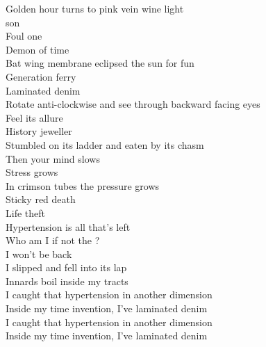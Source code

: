 Golden hour turns to pink vein wine light \\
 son \\
Foul one \\
Demon of time \\
Bat wing membrane eclipsed the sun for fun \\

Generation ferry \\
Laminated denim \\
Rotate anti-clockwise and see through backward facing eyes \\
Feel its allure \\
History jeweller \\
Stumbled on its ladder and eaten by its chasm \\
Then your mind slows \\
Stress grows \\
In crimson tubes the pressure grows \\
Sticky red death \\
Life theft \\
Hypertension is all that's left \\

Who am I if not the ? \\
I won't be back \\
I slipped and fell into its lap \\
Innards boil inside my tracts \\

I caught that hypertension in another dimension \\
Inside my time invention, I've laminated denim \\

I caught that hypertension in another dimension \\
Inside my time invention, I've laminated denim \\
